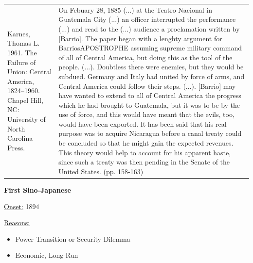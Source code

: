 {\begin{longtable}{p{}p{}}
Karnes, Thomas L. 1961. The Failure of Union: Central America, 1824–1960. Chapel Hill, NC: University of North Carolina Press. & On Febuary 28, 1885 (...) at the Teatro Nacional in Guatemala City (...) an officer interrupted the performance (...) and read to the (...) audience a proclamation written by [Barrio]. The paper began with a lenghty argument for BarriosAPOSTROPHE assuming supreme military command of all of Central America, but doing this as the tool of the people. (...). Doubtless there were enemies, but they would be subdued. Germany and Italy had united by force of arms, and Central America could follow their steps.
(...).
[Barrio] may have wanted to extend to all of Central America the progress which he had brought to Guatemala, but it was to be by the use of force, and this would have meant that the evils, too, would have been exported. It has been said that his real purpose was to acquire Nicaragua before a canal treaty could be concluded so that he might gain the expected revenues. This theory would help to account for his apparent haste, since such a treaty was then pending in the Senate of the United States. (pp. 158-163)
\\
\end{longtable}}
\clearpage
         \textbf{First Sino-Japanese} 

          \underline{Onset:} 1894         

\underline{Reasons:}
\begin{itemize}
\item Power Transition or Security Dilemma
\item Economic, Long-Run
\end{itemize}

